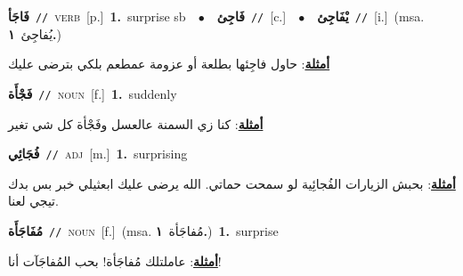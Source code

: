 \documentclass[10pt,a4paper,twoside]{article} %
\begin{document}
\begin{multicols}{2}
{\setlength\topsep{0pt}\textbf{\foreignlanguage{arabic}{فَاجَأ}}\ {\color{gray}\texttt{//}\color{black}}\ \textsc{verb}\ [p.]\ \textbf{1.}~surprise sb\ \ $\bullet$\ \ \setlength\topsep{0pt}\textbf{\foreignlanguage{arabic}{فَاجِئ}}\ {\color{gray}\texttt{//}\color{black}}\ [c.]\ \ $\bullet$\ \ \setlength\topsep{0pt}\textbf{\foreignlanguage{arabic}{يْفَاجِئ}}\ {\color{gray}\texttt{//}\color{black}}\ [i.]\ \color{gray}(msa. \foreignlanguage{arabic}{يُفاجِئ}~\foreignlanguage{arabic}{\textbf{١.}})\color{black}\  \begin{flushright}\color{gray}\foreignlanguage{arabic}{\textbf{\underline{\foreignlanguage{arabic}{أمثلة}}}: حاول فاجِئها بطلعة أو عزومة عمطعم بلكي بترضى عليك}\end{flushright}\color{black}} \vspace{2mm}

{\setlength\topsep{0pt}\textbf{\foreignlanguage{arabic}{فَجْأَة}}\ {\color{gray}\texttt{//}\color{black}}\ \textsc{noun}\ [f.]\ \textbf{1.}~suddenly\  \begin{flushright}\color{gray}\foreignlanguage{arabic}{\textbf{\underline{\foreignlanguage{arabic}{أمثلة}}}: كنا زي السمنة عالعسل وفَجْأة كل شي تغير}\end{flushright}\color{black}} \vspace{2mm}

{\setlength\topsep{0pt}\textbf{\foreignlanguage{arabic}{فُجَائِي}}\ {\color{gray}\texttt{//}\color{black}}\ \textsc{adj}\ [m.]\ \textbf{1.}~surprising\  \begin{flushright}\color{gray}\foreignlanguage{arabic}{\textbf{\underline{\foreignlanguage{arabic}{أمثلة}}}: بحبش الزيارات الفُجائِية لو سمحت حماتي. الله يرضى عليك ابعثيلي خبر بس بدك تيجي لعنا.}\end{flushright}\color{black}} \vspace{2mm}

{\setlength\topsep{0pt}\textbf{\foreignlanguage{arabic}{مُفَاجَأَة}}\ {\color{gray}\texttt{//}\color{black}}\ \textsc{noun}\ [f.]\ \color{gray}(msa. \foreignlanguage{arabic}{مُفاجَأة}~\foreignlanguage{arabic}{\textbf{١.}})\color{black}\ \textbf{1.}~surprise\  \begin{flushright}\color{gray}\foreignlanguage{arabic}{\textbf{\underline{\foreignlanguage{arabic}{أمثلة}}}: عاملتلك مُفاجَأة! بحب المُفاجَآت أنا!}\end{flushright}\color{black}} \vspace{2mm}


\end{multicols}
\end{document}
